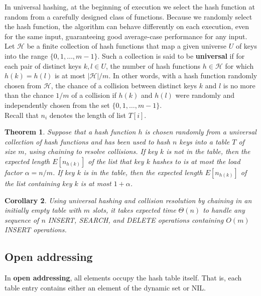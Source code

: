 \documentclass[12pt]{article}
\newtheorem{theorem}{Theorem}
\newtheorem{corollary}[theorem]{Corollary}
\begin{document}
In universal hashing, at the beginning of execution we select the hash function at random from a carefully designed class of functions. Because we randomly select the hash function, the algorithm can behave differently on each execution, even for the same input, guaranteeing good average-case performance for any input. \\

Let $\mathcal {H}$ be a finite collection of hash functions that map a given universe $U$ of keys into the range $\{ 0,1,\dots,m-1 \}$. Such a collection is said to be \textbf {universal} if for each pair of distinct keys $k, l \in U$, the number of hash functions $h \in \mathcal {H}$ for which $h(k) = h(l)$ is at most $|\mathcal {H}| / m$. In other words, with a hash function randomly chosen from $\mathcal {H}$, the chance of a collision between distinct keys $k$ and $l$ is no more than the chance $1/m$ of a collision if $h(k)$ and $h(l)$ were randomly and independently chosen from the set $\{ 0,1,\dots, m-1\}$. \\

Recall that $n_i$ denotes the length of list $T[i]$.

\begin{theorem}
  Suppose that a hash function $h$ is chosen randomly from a universal collection of hash functions and has been used to hash $n$ keys into a table $T$ of size $m$, using chaining to resolve collisions. If key $k$ is not in the table, then the expected length $E[n_{h(k)}]$ of the list that key $k$ hashes to is at most the load factor $\alpha = n/m$. If key $k$ is in the table, then the expected length $E[n_{h(k)}]$ of the list containing key $k$ is at most $1 + \alpha$.
\end{theorem}

\begin{corollary}
  Using universal hashing and collision resolution by chaining in an initially empty table with $m$ slots, it takes expected time $\Theta (n)$ to handle any sequence of $n$ INSERT, SEARCH, and DELETE operations containing $O(m)$ INSERT operations.
\end{corollary}

\subsection{Open addressing}

In \textbf {open addressing}, all elements occupy the hash table itself. That is, each table entry contains either an element of the dynamic set or NIL. \\
\end{document}

